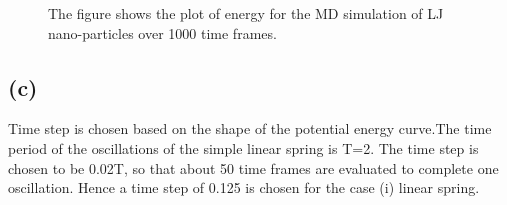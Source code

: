 \documentclass{article}
\begin{document}
\begin{figure}[H]
\begin{centering}
\caption{The figure shows the plot of energy for the MD simulation of LJ nano-particles over 1000 time frames.}
\label{fig:fig1}
\end{centering}
\end{figure}

\subsection{(c)}
\label{sec-2-3}
Time step is chosen based on the shape of the potential energy curve.The time period of the oscillations of the simple linear spring is T=2\PI. The time step is chosen to be 0.02T, so that about 50 time frames are evaluated to complete one oscillation. Hence a time step of 0.125 is chosen for the case (i) linear spring.
\end{document}
